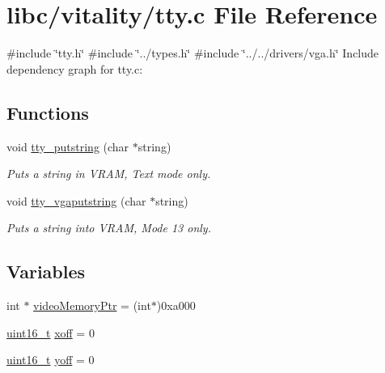 \hypertarget{a00041}{}\section{libc/vitality/tty.c File Reference}
\label{a00041}
{\ttfamily \#include \char`\"{}tty.\+h\char`\"{}}\newline
{\ttfamily \#include \char`\"{}../types.\+h\char`\"{}}\newline
{\ttfamily \#include \char`\"{}../../drivers/vga.\+h\char`\"{}}\newline
Include dependency graph for tty.\+c\+:
\subsection*{Functions}
\begin{DoxyCompactItemize}
\item 
void \hyperlink{a00041_a2ebb962f457a2677d70285d1c0f9be12_a2ebb962f457a2677d70285d1c0f9be12}{tty\+\_\+putstring} (char $\ast$string)
\begin{DoxyCompactList}\small\item\em Puts a string in V\+R\+AM, Text mode only. \end{DoxyCompactList}\item 
void \hyperlink{a00041_a13ff2c06d56753c5666ca56cb2d81100_a13ff2c06d56753c5666ca56cb2d81100}{tty\+\_\+vgaputstring} (char $\ast$string)
\begin{DoxyCompactList}\small\item\em Puts a string into V\+R\+AM, Mode 13 only. \end{DoxyCompactList}\end{DoxyCompactItemize}
\subsection*{Variables}
\begin{DoxyCompactItemize}
\item 
int $\ast$ \hyperlink{a00041_a3f896e9c00b9302e2287aad054199134_a3f896e9c00b9302e2287aad054199134}{video\+Memory\+Ptr} = (int$\ast$)0xa000
\item 
\hyperlink{a00035_a273cf69d639a59973b6019625df33e30_a273cf69d639a59973b6019625df33e30}{uint16\+\_\+t} \hyperlink{a00041_abaa0d20f0e52ce0d3a7d706f6ac16266_abaa0d20f0e52ce0d3a7d706f6ac16266}{xoff} = 0
\item 
\hyperlink{a00035_a273cf69d639a59973b6019625df33e30_a273cf69d639a59973b6019625df33e30}{uint16\+\_\+t} \hyperlink{a00041_a1a7539764d0ae8cd06ce45c62cf92bca_a1a7539764d0ae8cd06ce45c62cf92bca}{yoff} = 0
\end{DoxyCompactItemize}


